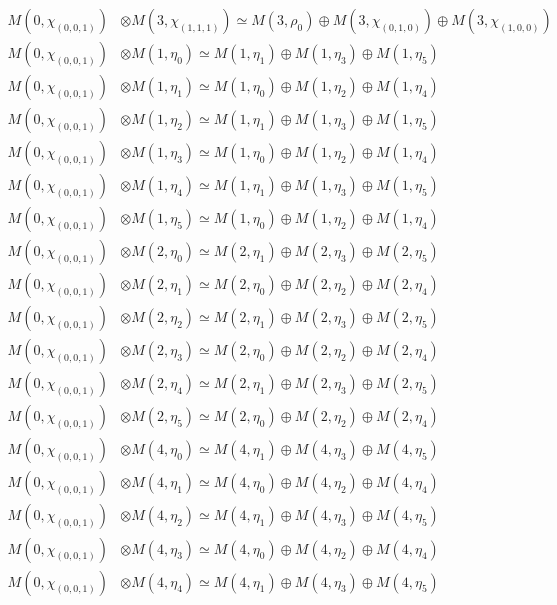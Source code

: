 \begin{align*}
M(0,\chi_{(0,0,1)}) &\otimes M(3,\chi_{(1,1,1)}) \simeq M(3,\rho_{0}) \oplus M(3,\chi_{(0,1,0)}) \oplus M(3,\chi_{(1,0,0)}) \\
M(0,\chi_{(0,0,1)}) &\otimes M(1,\eta_{0}) \simeq M(1,\eta_{1}) \oplus M(1,\eta_{3}) \oplus M(1,\eta_{5}) \\
M(0,\chi_{(0,0,1)}) &\otimes M(1,\eta_{1}) \simeq M(1,\eta_{0}) \oplus M(1,\eta_{2}) \oplus M(1,\eta_{4}) \\
M(0,\chi_{(0,0,1)}) &\otimes M(1,\eta_{2}) \simeq M(1,\eta_{1}) \oplus M(1,\eta_{3}) \oplus M(1,\eta_{5}) \\
M(0,\chi_{(0,0,1)}) &\otimes M(1,\eta_{3}) \simeq M(1,\eta_{0}) \oplus M(1,\eta_{2}) \oplus M(1,\eta_{4}) \\
M(0,\chi_{(0,0,1)}) &\otimes M(1,\eta_{4}) \simeq M(1,\eta_{1}) \oplus M(1,\eta_{3}) \oplus M(1,\eta_{5}) \\
M(0,\chi_{(0,0,1)}) &\otimes M(1,\eta_{5}) \simeq M(1,\eta_{0}) \oplus M(1,\eta_{2}) \oplus M(1,\eta_{4}) \\
M(0,\chi_{(0,0,1)}) &\otimes M(2,\eta_{0}) \simeq M(2,\eta_{1}) \oplus M(2,\eta_{3}) \oplus M(2,\eta_{5}) \\
M(0,\chi_{(0,0,1)}) &\otimes M(2,\eta_{1}) \simeq M(2,\eta_{0}) \oplus M(2,\eta_{2}) \oplus M(2,\eta_{4}) \\
M(0,\chi_{(0,0,1)}) &\otimes M(2,\eta_{2}) \simeq M(2,\eta_{1}) \oplus M(2,\eta_{3}) \oplus M(2,\eta_{5}) \\
M(0,\chi_{(0,0,1)}) &\otimes M(2,\eta_{3}) \simeq M(2,\eta_{0}) \oplus M(2,\eta_{2}) \oplus M(2,\eta_{4}) \\
M(0,\chi_{(0,0,1)}) &\otimes M(2,\eta_{4}) \simeq M(2,\eta_{1}) \oplus M(2,\eta_{3}) \oplus M(2,\eta_{5}) \\
M(0,\chi_{(0,0,1)}) &\otimes M(2,\eta_{5}) \simeq M(2,\eta_{0}) \oplus M(2,\eta_{2}) \oplus M(2,\eta_{4}) \\
M(0,\chi_{(0,0,1)}) &\otimes M(4,\eta_{0}) \simeq M(4,\eta_{1}) \oplus M(4,\eta_{3}) \oplus M(4,\eta_{5}) \\
M(0,\chi_{(0,0,1)}) &\otimes M(4,\eta_{1}) \simeq M(4,\eta_{0}) \oplus M(4,\eta_{2}) \oplus M(4,\eta_{4}) \\
M(0,\chi_{(0,0,1)}) &\otimes M(4,\eta_{2}) \simeq M(4,\eta_{1}) \oplus M(4,\eta_{3}) \oplus M(4,\eta_{5}) \\
M(0,\chi_{(0,0,1)}) &\otimes M(4,\eta_{3}) \simeq M(4,\eta_{0}) \oplus M(4,\eta_{2}) \oplus M(4,\eta_{4}) \\
M(0,\chi_{(0,0,1)}) &\otimes M(4,\eta_{4}) \simeq M(4,\eta_{1}) \oplus M(4,\eta_{3}) \oplus M(4,\eta_{5}) \\

\end{align*}

